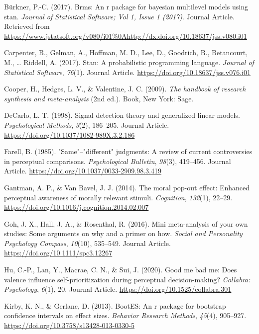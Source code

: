 \documentclass[
  english,
  man]{apa6}
\begin{document}
\leavevmode\hypertarget{ref-Buxfcrkner_2017}{}%
Bürkner, P.-C. (2017). Brms: An r package for bayesian multilevel models using stan. \emph{Journal of Statistical Software; Vol 1, Issue 1 (2017)}. Journal Article. Retrieved from \url{https://www.jstatsoft.org/v080/i01\%0Ahttp://dx.doi.org/10.18637/jss.v080.i01}

\leavevmode\hypertarget{ref-Carpenter_2017_stan}{}%
Carpenter, B., Gelman, A., Hoffman, M. D., Lee, D., Goodrich, B., Betancourt, M., \ldots{} Riddell, A. (2017). Stan: A probabilistic programming language. \emph{Journal of Statistical Software}, \emph{76}(1). Journal Article. \url{https://doi.org/10.18637/jss.v076.i01}

\leavevmode\hypertarget{ref-Cooper_2009_handbook}{}%
Cooper, H., Hedges, L. V., \& Valentine, J. C. (2009). \emph{The handbook of research synthesis and meta-analysis} (2nd ed.). Book, New York: Sage.

\leavevmode\hypertarget{ref-DeCarlo_1998}{}%
DeCarlo, L. T. (1998). Signal detection theory and generalized linear models. \emph{Psychological Methods}, \emph{3}(2), 186--205. Journal Article. \url{https://doi.org/10.1037/1082-989X.3.2.186}

\leavevmode\hypertarget{ref-Farell_1985}{}%
Farell, B. (1985). "Same"--"different" judgments: A review of current controversies in perceptual comparisons. \emph{Psychological Bulletin}, \emph{98}(3), 419--456. Journal Article. \url{https://doi.org/10.1037/0033-2909.98.3.419}

\leavevmode\hypertarget{ref-gantman_moral_2014}{}%
Gantman, A. P., \& Van Bavel, J. J. (2014). The moral pop-out effect: Enhanced perceptual awareness of morally relevant stimuli. \emph{Cognition}, \emph{132}(1), 22--29. \url{https://doi.org/10.1016/j.cognition.2014.02.007}

\leavevmode\hypertarget{ref-Goh_2016_mini}{}%
Goh, J. X., Hall, J. A., \& Rosenthal, R. (2016). Mini meta-analysis of your own studies: Some arguments on why and a primer on how. \emph{Social and Personality Psychology Compass}, \emph{10}(10), 535--549. Journal Article. \url{https://doi.org/10.1111/spc3.12267}

\leavevmode\hypertarget{ref-Hu_2020_GoodSelf}{}%
Hu, C.-P., Lan, Y., Macrae, C. N., \& Sui, J. (2020). Good me bad me: Does valence influence self-prioritization during perceptual decision-making? \emph{Collabra: Psychology}, \emph{6}(1), 20. Journal Article. \url{https://doi.org/10.1525/collabra.301}

\leavevmode\hypertarget{ref-kirby_bootes_2013}{}%
Kirby, K. N., \& Gerlanc, D. (2013). BootES: An r package for bootstrap confidence intervals on effect sizes. \emph{Behavior Research Methods}, \emph{45}(4), 905--927. \url{https://doi.org/10.3758/s13428-013-0330-5}
\end{document}
